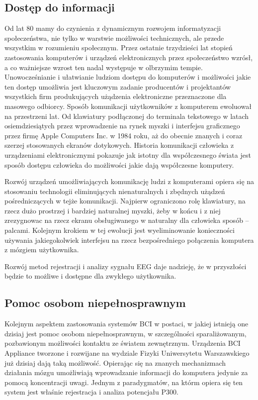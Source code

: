 \documentclass[licencjacka,openright]{pracamgr}
\begin{document}
\subsection{Dostęp do informacji}
Od lat 80 mamy do czynienia z dynamicznym rozwojem informatyzacji społeczeństwa, nie tylko w warstwie możliwości technicznych, ale przede wszystkim w rozumieniu społecznym. Przez ostatnie trzydzieści lat stopień zastosowania komputerów i urządzeń elektronicznych przez społeczeństwo wzrósł, a co ważniejsze wzrost ten nadal występuje w olbrzymim tempie. Unowocześnianie i ułatwianie ludziom dostępu do komputerów i możliwości jakie ten dostęp umożliwia jest kluczowym zadanie producentów i projektantów wszystkich firm produkujących użądzenia elektroniczne przeznaczone dla masowego odbiorcy. Sposób komunikacji użytkowników z komputerem ewoluował na przestrzeni lat. Od klawiatury podłączonej do terminala tekstowego w latach osiemdziesiątych przez wprowadzenie na rynek myszki i interfejsu graficznego przez firmę Apple Computers Inc. w 1984 roku, aż do obecnie znanych i coraz szerzej stosowanych ekranów dotykowych. Historia komunikacji człowieka z urządzeniami elektronicznymi pokazuje jak istotny dla współczesnego świata jest sposób dostępu człowieka do możliwości jakie dają współczesne komputery.

Rozwój urządzeń umożliwiających komunikację ludzi z komputerami opiera się na stosowaniu technologii eliminujących nienaturalnych i zbędnych użądzeń pośredniczących w tejże komunikacji. Najpierw ograniczono rolę klawiatury, na rzecz dużo prostrzej i bardziej naturalnej myszki, żeby w końcu i z niej zrezygnowac na rzecz ekranu obsługiwanego w naturalny dla człowieka sposób -- palcami. Kolejnym krokiem w tej ewolucji jest wyeliminowanie konieczności używania jakiegokolwiek interfejsu na rzecz bezpośredniego połączenia komputera z mózgiem użytkownika.

Rozwój metod rejestracji i analizy sygnału EEG daje nadzieję, że w przyszłości będzie to możliwe i dostępne dla zwykłego użytkownika.
\subsection{Pomoc osobom niepełnosprawnym}
Kolejnym aspektem zastosowania systemów BCI w postaci, w jakiej istnieją one dzisiaj jest pomoc osobom niepełnosprawnym, w szczególności sparaliżowanym, pozbawionym możliwości kontaktu ze światem zewnętrznym. Urządzenia BCI Appliance tworzone i rozwijane na wydziale Fizyki Uniwersytetu Warszawskiego już dzisiaj dają taką możliwość. Opierając się na znanych mechanizmach działania mózgu umożliwiają wprowadzanie informacji do komputera jedynie za pomocą koncentracji uwagi. Jednym z paradygmatów, na którm opiera się ten system jest właśnie rejestracja i analiza potencjału P300.
\end{document}
